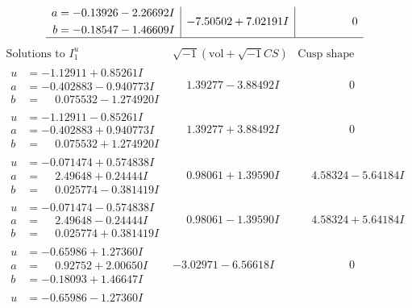 \documentclass[1p]{elsarticle_modified}
\theoremstyle{definition}
\newcommand{\I}{\sqrt{-1}}
\begin{document}
$$\begin{array}{c|c|c}
\begin{aligned}
a &= -0.13926 - 2.26692 I \\
b &= -0.18547 - 1.46609 I\end{aligned}
 & -7.50502 + 7.02191 I & \phantom{-0.000000 } 0\\
 \hline 
 \end{array}$$\newpage$$\begin{array}{c|c|c}  
\text{Solutions to }I^u_{1}& \I (\text{vol} + \sqrt{-1}CS) & \text{Cusp shape}\\
 \hline 
\begin{aligned}
u &= -1.12911 + 0.85261 I \\
a &= -0.402883 - 0.940773 I \\
b &= \phantom{-}0.075532 - 1.274920 I\end{aligned}
 & \phantom{-}1.39277 - 3.88492 I & \phantom{-0.000000 } 0 \\ \hline\begin{aligned}
u &= -1.12911 - 0.85261 I \\
a &= -0.402883 + 0.940773 I \\
b &= \phantom{-}0.075532 + 1.274920 I\end{aligned}
 & \phantom{-}1.39277 + 3.88492 I & \phantom{-0.000000 } 0 \\ \hline\begin{aligned}
u &= -0.071474 + 0.574838 I \\
a &= \phantom{-}2.49648 + 0.24444 I \\
b &= \phantom{-}0.025774 - 0.381419 I\end{aligned}
 & \phantom{-}0.98061 + 1.39590 I & \phantom{-}4.58324 - 5.64184 I \\ \hline\begin{aligned}
u &= -0.071474 - 0.574838 I \\
a &= \phantom{-}2.49648 - 0.24444 I \\
b &= \phantom{-}0.025774 + 0.381419 I\end{aligned}
 & \phantom{-}0.98061 - 1.39590 I & \phantom{-}4.58324 + 5.64184 I \\ \hline\begin{aligned}
u &= -0.65986 + 1.27360 I \\
a &= \phantom{-}0.92752 + 2.00650 I \\
b &= -0.18093 + 1.46647 I\end{aligned}
 & -3.02971 - 6.56618 I & \phantom{-0.000000 } 0 \\ \hline\begin{aligned}
u &= -0.65986 - 1.27360 I \\

\end{aligned}
\end{array}$$
\end{document}
